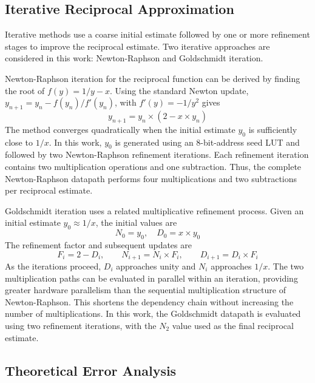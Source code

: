 \documentclass[manuscript,screen,review]{acmart}
\begin{document}
\subsection{Iterative Reciprocal Approximation}

Iterative methods use a coarse initial estimate followed by one or more refinement stages to improve the reciprocal estimate. Two iterative approaches are considered in this work: Newton-Raphson and Goldschmidt iteration.

Newton-Raphson iteration for the reciprocal function can be derived by finding the root of $f(y) = 1/y - x$. Using the standard Newton update, $y_{n+1} = y_n - f(y_n)/f'(y_n)$, with $f'(y) = -1/y^2$ gives
\begin{equation}
y_{n+1} = y_n \times (2 - x \times y_n)
\label{eq:nr}
\end{equation}
The method converges quadratically when the initial estimate $y_0$ is sufficiently close to $1/x$. In this work, $y_0$ is generated using an 8-bit-address seed LUT and followed by two Newton-Raphson refinement iterations. Each refinement iteration contains two multiplication operations and one subtraction. Thus, the complete Newton-Raphson datapath performs four multiplications and two subtractions per reciprocal estimate.

Goldschmidt iteration uses a related multiplicative refinement process. Given an initial estimate $y_0 \approx 1/x$, the initial values are
\begin{equation}
N_0 = y_0, \quad D_0 = x \times y_0
\label{eq:gold_init}
\end{equation}
The refinement factor and subsequent updates are
\begin{equation}
F_i = 2 - D_i, \qquad N_{i+1} = N_i \times F_i, \qquad D_{i+1} = D_i \times F_i
\label{eq:gold_update}
\end{equation}
As the iterations proceed, $D_i$ approaches unity and $N_i$ approaches $1/x$. The two multiplication paths can be evaluated in parallel within an iteration, providing greater hardware parallelism than the sequential multiplication structure of Newton-Raphson. This shortens the dependency chain without increasing the number of multiplications. In this work, the Goldschmidt datapath is evaluated using two refinement iterations, with the $N_2$ value used as the final reciprocal estimate.

\subsection{Theoretical Error Analysis}
\end{document}
